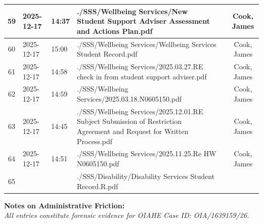 \begin{landscape}
\begin{tabularx}{\linewidth}{|c|l|l|X|c|c|}
		59                               & 2025-12-17          & 14:37          & ./SSS/Wellbeing Services/New Student Support Adviser Assessment and Actions Plan.pdf                                   &                         & Cook, James              \\ \hline
		60                               & 2025-12-17          & 15:00          & ./SSS/Wellbeing Services/Wellbeing Services Student Record.pdf                                                         &                         & Cook, James              \\ \hline
		61                               & 2025-12-17          & 14:58          & ./SSS/Wellbeing Services/2025.03.27.RE check in from student support adviser.pdf                                       &                         & Cook, James              \\ \hline
		62                               & 2025-12-17          & 14:59          & ./SSS/Wellbeing Services/2025.03.18.N0605150.pdf                                                                       &                         & Cook, James              \\ \hline
		63                               & 2025-12-17          & 14:45          & ./SSS/Wellbeing Services/2025.12.01.RE Subject Submission of Restriction Agreement and Request for Written Process.pdf &                         & Cook, James              \\ \hline
		64                               & 2025-12-17          & 14:51          & ./SSS/Wellbeing Services/2025.11.25.Re HW N0605150.pdf                                                                 &                         & Cook, James              \\ \hline
		65                               &                     &                & ./SSS/Disability/Disability Services Student Record.R.pdf                                                              &                         &                          \\ \hline
	\end{tabularx}

	\vspace{1.5em}

	\noindent \textbf{Notes on Administrative Friction:} \hrulefill \\
	\noindent \textit{All entries constitute forensic evidence for OIAHE Case ID: OIA/1639159/26.}

\end{landscape}
